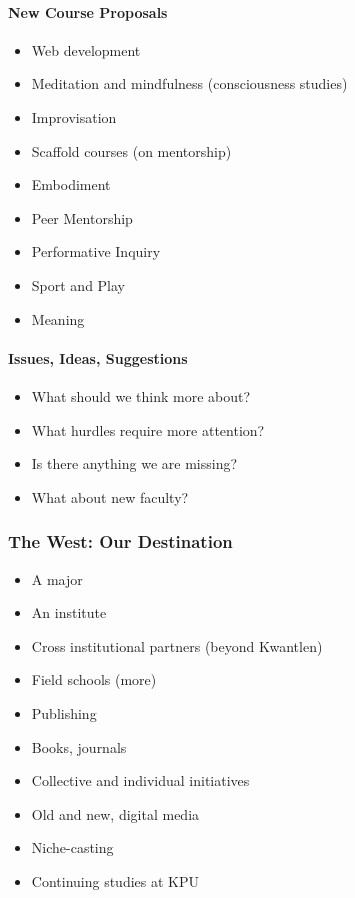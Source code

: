 \documentclass[letterpaper,10pt,headsepline]{scrreprt}
\begin{document}
\paragraph{New Course Proposals}

\begin{itemize}
\itemsep1pt\parskip0pt
\item
  Web development
\item
  Meditation and mindfulness (consciousness studies)
\item
  Improvisation
\item
  Scaffold courses (on mentorship)
\item
  Embodiment
\item
  Peer Mentorship
\item
  Performative Inquiry
\item
  Sport and Play
\item
  Meaning
\end{itemize}

\paragraph{Issues, Ideas, Suggestions}

\begin{itemize}
\itemsep1pt\parskip0pt
\item
  What should we think more about?
\item
  What hurdles require more attention?
\item
  Is there anything we are missing?
\item
  What about new faculty?
\end{itemize}

\subsubsection{The West: Our Destination}

\begin{itemize}
\itemsep1pt\parskip0pt
\item
  A major
\item
  An institute
\item
  Cross institutional partners (beyond Kwantlen)
\item
  Field schools (more)
\item
  Publishing
\item
  Books, journals
\item
  Collective and individual initiatives
\item
  Old and new, digital media
\item
  Niche-casting
\item
  Continuing studies at KPU
\end{itemize}
\end{document}
